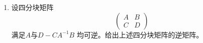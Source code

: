 \documentclass[10pt]{article}
\theoremstyle{definition}
\theoremstyle{definition}
\begin{document}
\begin{enumerate}
\begin{proof}
\begin{enumerate}[label=(\roman*)]
\begin{equation*}
\begin{aligned}
                                                                    & = A
                        \end{aligned}
                    \end{equation*}
                \item
                    对任意的$n$阶方阵$A=(b_{ij})_n$，有
                    \begin{equation*}
                        \begin{aligned}
                            \frac{\partial \beta' A\beta}{\partial \beta}
        &=\frac{\partial}{\partial \beta}\left(\sum_{i=1}^{n}\sum_{j=1}^{n}b_{ij}\beta_i\beta_j\right) \\
        &=\left(\frac{\partial}{\partial \beta_1}\, ,\frac{\partial}{\partial \beta_2}\, ,\cdots ,\frac{\partial}{\partial \beta_n}\right)'\left(\sum_{i=1}^{n}\sum_{j=1}^{n}b_{ij}\beta_i\beta_j\right) \\
        &=(A+A')\beta
                        \end{aligned}
                    \end{equation*}
                    特别地，当$A$为对称矩阵时，有
                    \begin{equation*}
                        \frac{\partial \beta' A\beta}{\partial \beta}=2A\beta
                    \end{equation*}
            \end{enumerate}
        \end{proof}

    \item	%
        设四分块矩阵 \begin{equation*}
            \begin{pmatrix}
                A & B \\
                C & D
            \end{pmatrix}
        \end{equation*}满足$A$与$D-CA^{-1}B$
        均可逆。给出上述四分块矩阵的逆矩阵。


\end{enumerate}
\end{document}

